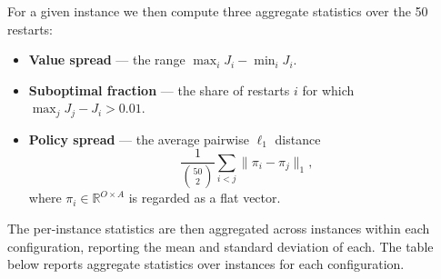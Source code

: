 \documentclass{article}
\theoremstyle{definition}
\theoremstyle{remark}
\begin{document}
For a given instance we then compute three aggregate statistics over the 50 restarts:
\begin{itemize}
  \item \textbf{Value spread} --- the range $\max_i J_i - \min_i J_i$.
  \item \textbf{Suboptimal fraction} --- the share of restarts $i$ for which
        $\max_j J_j - J_i > 0.01$.
  \item \textbf{Policy spread} --- the average pairwise $\ell_1$ distance
        \[
          \frac{1}{\binom{50}{2}} \sum_{i<j} \|\pi_i - \pi_j\|_1,
        \]
        where $\pi_i \in \mathbb{R}^{O \times A}$ is regarded as a flat
        vector. 
\end{itemize}
 
The per-instance statistics are then aggregated across instances within each configuration, reporting the mean and standard deviation of each. The table below reports aggregate statistics over instances for each configuration. 
\end{document}

